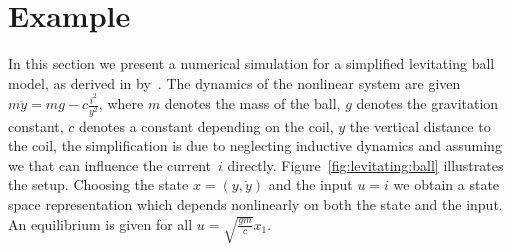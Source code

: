 \section{Example}\label{sec:example}
In this section we present a numerical simulation for a simplified levitating ball model, as derived in 
by~\cite{Schaich:2015}. The dynamics of the nonlinear system are given $m\ddot y = m g - c\frac{i^2}{y^2}$,
where $m$ denotes the mass of the ball, $g$ denotes the gravitation constant, $c$ denotes a constant depending
on the coil, $y$ the vertical distance to the coil, the simplification is due to neglecting inductive dynamics 
and assuming we that can influence the current~$i$ directly. Figure~\ref{fig:levitating:ball} illustrates the setup.
Choosing the state $x=(y,\dot y)$ and the input $u=i$ we obtain a state space representation which depends nonlinearly
on both the state and the input. An equilibrium is given for all $u=\sqrt{\frac{gm}{c}}x_1$.

